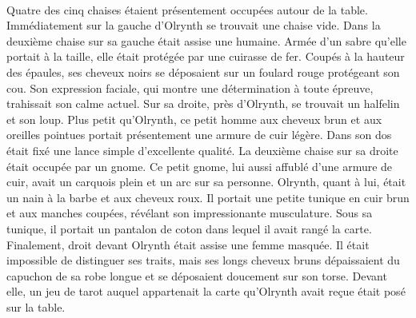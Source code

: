 \documentclass[main.tex]{subfiles}
\begin{document}
    \\
    Quatre des cinq chaises étaient présentement occupées autour de la table.
    Immédiatement sur la gauche d'Olrynth se trouvait une chaise vide.
    Dans la deuxième chaise sur sa gauche était assise une humaine.
    Armée d'un sabre qu'elle portait à la taille, elle était protégée par une cuirasse de fer.
    Coupés à la hauteur des épaules, ses cheveux noirs se déposaient sur un foulard rouge protégeant son cou.
    Son expression faciale, qui montre une détermination à toute épreuve, trahissait son calme actuel.
    Sur sa droite, près d'Olrynth, se trouvait un halfelin et son loup.
    Plus petit qu'Olrynth, ce petit homme aux cheveux brun et aux oreilles pointues portait présentement une armure de cuir légère.
    Dans son dos était fixé une lance simple d'excellente qualité.
    La deuxième chaise sur sa droite était occupée par un gnome.
    Ce petit gnome, lui aussi affublé d'une armure de cuir, avait un carquois plein et un arc sur sa personne.
    Olrynth, quant à lui, était un nain à la barbe et aux cheveux roux.
    Il portait une petite tunique en cuir brun et aux manches coupées, révélant son impressionante musculature.
    Sous sa tunique, il portait un pantalon de coton dans lequel il avait rangé la carte.
    Finalement, droit devant Olrynth était assise une femme masquée.
    Il était impossible de distinguer ses traits, mais ses longs cheveux bruns dépaissaient du capuchon de sa robe longue et se déposaient doucement sur son torse.
    Devant elle, un jeu de tarot auquel appartenait la carte qu'Olrynth avait reçue était posé sur la table.\\
    \\
\end{document}
